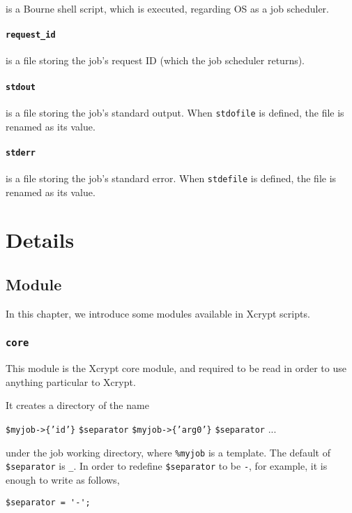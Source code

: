 \documentclass[a4paper,10pt]{report}
\begin{document}
is a Bourne shell script, which is executed, regarding OS as a job
scheduler.

\subsection*{\texttt{request\_id}}

is a file storing the job's request ID (which the job scheduler
returns).

\subsection*{\texttt{stdout}}

is a file storing the job's standard output.  When \texttt{stdofile}
is defined, the file is renamed as its value.

\subsection*{\texttt{stderr}}

is a file storing the job's standard error.  When \texttt{stdefile}
is defined, the file is renamed as its value.

\part{Details}
\chapter{Module}\label{chapmodule}

In this chapter, we introduce some modules available in Xcrypt scripts.

\section{\texttt{core}}

This module is the Xcrypt core module, and required to be read in
order to use anything particular to Xcrypt.

It creates a directory of the name
\begin{center}
 \texttt{\$myjob->\{'id'\}} \texttt{\$separator}
 \texttt{\$myjob->\{'arg0'\}} \texttt{\$separator} ...
\end{center}
under the job working directory, where \texttt{\%myjob} is a template.
The default of \texttt{\$separator} is \texttt{\_}.  In order to
redefine \texttt{\$separator} to be \texttt{-}, for example, it is
enough to write as follows,
\begin{boxnote}
\begin{verbatim}
$separator = '-';
\end{verbatim}
\end{boxnote}
\vspace{\baselineskip}
\end{document}
